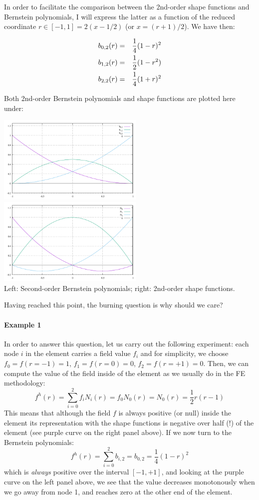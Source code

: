 In order to facilitate the comparison between the 2nd-order shape functions and Bernstein 
polynomials, I will express the latter as a function of the reduced coordinate
$r\in[-1,1]=2(x-1/2)$ (or $x=(r+1)/2$). We have then:

\begin{eqnarray}
b_{0,2}(r) &=& \frac{1}{4}(1-r)^2 \nonumber\\
b_{1,2}(r) &=& \frac{1}{2}(1-r^2) \nonumber\\
b_{2,2}(r) &=& \frac{1}{4}(1+r)^2
\end{eqnarray}

Both 2nd-order Bernstein polynomials and shape functions are plotted here under:
\begin{center}
\includegraphics[width=7cm]{images/bernstein/b2_.pdf}
\includegraphics[width=7cm]{images/bernstein/N2_.pdf}\\
{\captionfont Left: Second-order Bernstein polynomials; right: 2nd-order shape functions.}
\end{center}

Having reached this point, the burning question is why should we care?

\paragraph{Example 1}
In order to answer this question, let us carry out the following 
experiment: each node $i$ in the element carries a field value $f_i$ and for simplicity, 
we choose $f_0=f(r=-1)=1$, $f_1=f(r=0)=0$, $f_2=f(r=+1)=0$.
Then, we can compute the value of the field inside of the element 
as we usually do in the FE methodology:
\[
f^h(r) = \sum_{i=0}^2 f_i N_i(r) = f_0 N_0(r) = N_0(r) = \frac{1}{2}r(r-1)
\]
This means that although the field $f$ is always positive (or null) inside the element
its representation with the shape functions is negative over half (!) of the element
(see purple curve on the right panel above).
If we now turn to the Bernstein polynomials:
\[
f^h(r) = \sum_{i=0}^2 b_{i,2} = b_{0,2} = \frac{1}{4}(1-r)^2
\]
which is {\it always} positive over the interval $[-1,+1]$, 
and looking at the purple curve on the left panel above, 
we see that the value decreases monotonously when we go away from node 1, and reaches 
zero at the other end of the element. 

